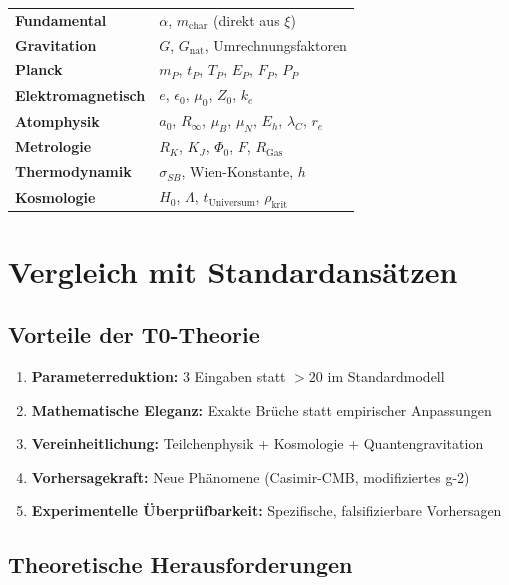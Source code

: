 \documentclass[12pt,a4paper]{report}
\begin{document}
	\begin{center}
		\begin{tabular}{ll}
			\textbf{Fundamental} & $\alpha$, $m_{\text{char}}$ (direkt aus $\xi$) \\
			\textbf{Gravitation} & $G$, $G_{\text{nat}}$, Umrechnungsfaktoren \\
			\textbf{Planck} & $m_P$, $t_P$, $T_P$, $E_P$, $F_P$, $P_P$ \\
			\textbf{Elektromagnetisch} & $e$, $\epsilon_0$, $\mu_0$, $Z_0$, $k_e$ \\
			\textbf{Atomphysik} & $a_0$, $R_\infty$, $\mu_B$, $\mu_N$, $E_h$, $\lambda_C$, $r_e$ \\
			\textbf{Metrologie} & $R_K$, $K_J$, $\Phi_0$, $F$, $R_{\text{Gas}}$ \\
			\textbf{Thermodynamik} & $\sigma_{SB}$, Wien-Konstante, $h$ \\
			\textbf{Kosmologie} & $H_0$, $\Lambda$, $t_{\text{Universum}}$, $\rho_{\text{krit}}$ \\
		\end{tabular}
	\end{center}
	
	\section{Vergleich mit Standardansätzen}
	
	\subsection{Vorteile der T0-Theorie}
	
	\begin{enumerate}
		\item \textbf{Parameterreduktion:} 3 Eingaben statt $>20$ im Standardmodell
		\item \textbf{Mathematische Eleganz:} Exakte Brüche statt empirischer Anpassungen
		\item \textbf{Vereinheitlichung:} Teilchenphysik + Kosmologie + Quantengravitation
		\item \textbf{Vorhersagekraft:} Neue Phänomene (Casimir-CMB, modifiziertes g-2)
		\item \textbf{Experimentelle Überprüfbarkeit:} Spezifische, falsifizierbare Vorhersagen
	\end{enumerate}
	
	\subsection{Theoretische Herausforderungen}
	
\end{document}
